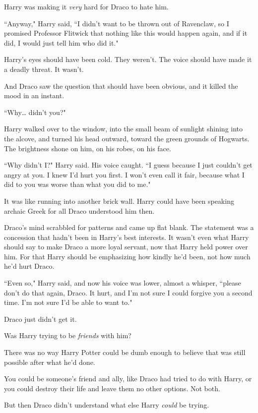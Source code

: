 Harry was making it \emph{very} hard for Draco to hate him.

``Anyway," Harry said, ``I didn't want to be thrown out of Ravenclaw, so I promised Professor Flitwick that nothing like this would happen again, and if it did, I would just tell him who did it."

Harry's eyes should have been cold. They weren't. The voice should have made it a deadly threat. It wasn't.

And Draco saw the question that should have been obvious, and it killed the mood in an instant.

``Why{\ldots} didn't you?"

Harry walked over to the window, into the small beam of sunlight shining into the alcove, and turned his head outward, toward the green grounds of Hogwarts. The brightness shone on him, on his robes, on his face.

``Why didn't I?" Harry said. His voice caught. ``I guess because I just couldn't get angry at you. I knew I'd hurt you first. I won't even call it fair, because what I did to you was worse than what you did to me."

It was like running into another brick wall. Harry could have been speaking archaic Greek for all Draco understood him then.

Draco's mind scrabbled for patterns and came up flat blank. The statement was a concession that hadn't been in Harry's best interests. It wasn't even what Harry should say to make Draco a more loyal servant, now that Harry held power over him. For that Harry should be emphasizing how kindly he'd been, not how much he'd hurt Draco.

``Even so," Harry said, and now his voice was lower, almost a whisper, ``please don't do that again, Draco. It hurt, and I'm not sure I could forgive you a second time. I'm not sure I'd be able to want to."

Draco just didn't get it.

Was Harry trying to be \emph{friends} with him?

There was no way Harry Potter could be dumb enough to believe that was still possible after what he'd done.

You could be someone's friend and ally, like Draco had tried to do with Harry, or you could destroy their life and leave them no other options. Not both.

But then Draco didn't understand what else Harry \emph{could} be trying.

